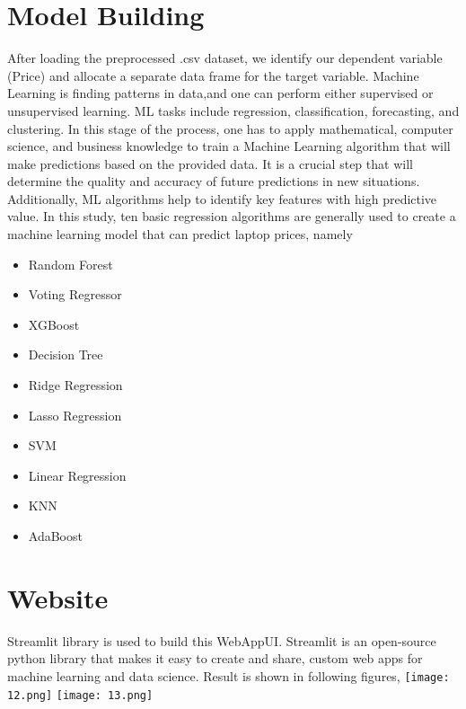 \documentclass[
11pt, %
english, %
singlespacing, %
headsepline, %
]{MastersDoctoralThesis} %
\begin{document}
\section{Model Building}
After loading the preprocessed .csv dataset, we 
identify our dependent variable (Price) and allocate 
a separate data frame for the target variable.
Machine Learning is finding patterns in data,and 
one can perform either supervised or unsupervised 
learning. ML tasks include regression, 
classification, forecasting, and clustering.
In this stage of the process, one has to apply
mathematical, computer science, and business
knowledge to train a Machine Learning algorithm 
that will make predictions based on the provided 
data. It is a crucial step that will determine the 
quality and accuracy of future predictions in new 
situations. Additionally, ML algorithms help to 
identify key features with high predictive value.\break
In this study, ten basic regression algorithms 
are generally used to create a machine learning 
model that can predict laptop prices, namely 
\begin{itemize}
    \item Random Forest
    \item Voting Regressor
    \item  XGBoost
    \item Decision Tree
    \item Ridge Regression
    \item Lasso Regression
    \item SVM
    \item Linear Regression
    \item KNN
    \item AdaBoost
\end{itemize}

\section{Website}
Streamlit library is used to build this WebAppUI. 
Streamlit is an open-source \hfill python library that 
makes it easy to create and share, custom web apps 
for machine learning and data science. Result is
shown in following figures,\hfill\break\break
    \centering
    \texttt{[image: 12.png]}
    \break\break
    \centering
    \texttt{[image: 13.png]}
\end{document}
